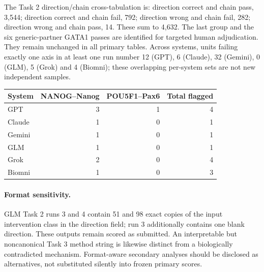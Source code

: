 The Task 2 direction/chain cross-tabulation is: direction correct and chain pass, 3,544; direction correct and chain fail, 792; direction wrong and chain fail, 282; direction wrong and chain pass, 14. These sum to 4,632. The last group and the six generic-partner GATA1 passes are identified for targeted human adjudication. They remain unchanged in all primary tables. Across systems, units failing exactly one axis in at least one run number 12 (GPT), 6 (Claude), 32 (Gemini), 0 (GLM), 5 (Grok) and 4 (Biomni); these overlapping per-system sets are not new independent samples.

\begin{center}
\begin{tabular}{lrrr}
\toprule
System & NANOG--Nanog & POU5F1--Pax6 & Total flagged \\
\midrule
GPT & 3 & 1 & 4 \\
Claude & 1 & 0 & 1 \\
Gemini & 1 & 0 & 1 \\
GLM & 1 & 0 & 1 \\
Grok & 2 & 0 & 4 \\
Biomni & 1 & 0 & 3 \\
\bottomrule
\end{tabular}
\end{center}
\paragraph{Format sensitivity.} GLM Task 2 runs 3 and 4 contain 51 and 98 exact copies of the input intervention class in the direction field; run 3 additionally contains one blank direction. These outputs remain scored as submitted. An interpretable but noncanonical Task 3 method string is likewise distinct from a biologically contradicted mechanism. Format-aware secondary analyses should be disclosed as alternatives, not substituted silently into frozen primary scores.

\clearpage
